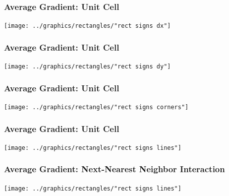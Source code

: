 \documentclass[handout]{beamer}
\begin{document}
\begin{frame}
  \frametitle{Average Gradient: Unit Cell}  %
  \begin{center}
    \texttt{[image: ../graphics/rectangles/"rect signs dx"]}
  \end{center}
\end{frame}

\begin{frame}
  \frametitle{Average Gradient: Unit Cell}  %
  \begin{center}
    \texttt{[image: ../graphics/rectangles/"rect signs dy"]}
  \end{center}
\end{frame}

\begin{frame}
  \frametitle{Average Gradient: Unit Cell}  %
  \begin{center}
    \texttt{[image: ../graphics/rectangles/"rect signs corners"]}
  \end{center}
\end{frame}

\begin{frame}
  \frametitle{Average Gradient: Unit Cell}  %
  \begin{center}
    \texttt{[image: ../graphics/rectangles/"rect signs lines"]}
  \end{center}
\end{frame}

\begin{frame}
  \frametitle{Average Gradient: Next-Nearest Neighbor Interaction}  %
  \begin{center}
    \texttt{[image: ../graphics/rectangles/"rect signs lines"]}
  \end{center}
\end{frame}
\end{document}
